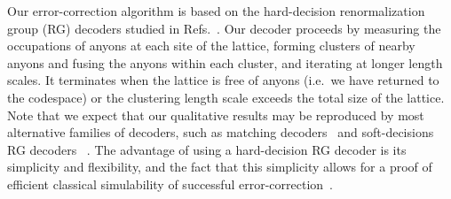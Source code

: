 \documentclass[aps, prl, letterpaper, twocolumn, superscriptaddress, notitlepage, 10pt]{revtex4-1}
\begin{document}
	Our error-correction algorithm is based on the hard-decision renormalization group (RG) decoders studied in Refs.~\cite{?}. Our decoder proceeds by measuring the occupations of anyons at each site of the lattice, forming clusters of nearby anyons and fusing the anyons within each cluster, and iterating at longer length scales. It terminates when the lattice is free of anyons (i.e.~we have returned to the codespace) or the clustering length scale exceeds the total size of the lattice.   Note that we expect that our qualitative results may be reproduced by most alternative families of decoders, such as matching decoders~\cite{?} and soft-decisions RG decoders~\cite{?} . The advantage of using a hard-decision RG decoder is its simplicity and flexibility, and the fact that this simplicity allows for a proof of efficient classical simulability of successful error-correction~\cite{RGsim}.
\end{document}
